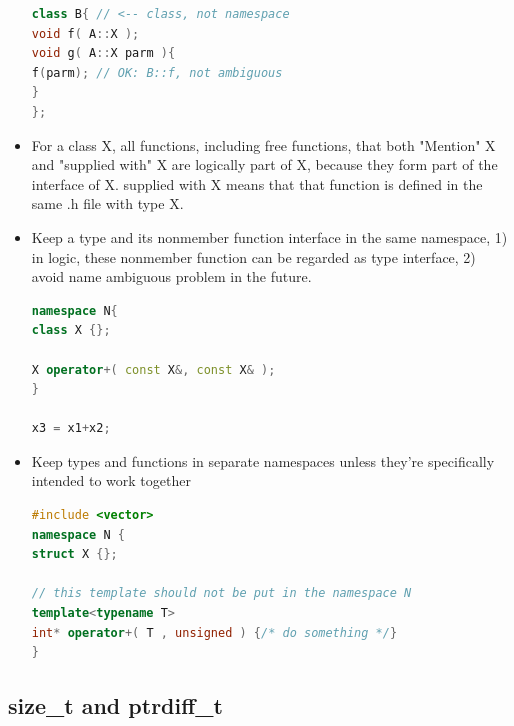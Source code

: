\documentclass[a4paper,12pt,twoside]{book}
\begin{document}
\begin{itemize}
\begin{lstlisting}[frame=single, language=c++]
class B{ // <-- class, not namespace
void f( A::X );
void g( A::X parm ){
f(parm); // OK: B::f, not ambiguous
}
};
\end{lstlisting}

\item For a class X, all functions, including free functions, that both "Mention" X
and "supplied with" X are logically part of X, because they form part of the interface of X. supplied with X means that that function is defined in the same .h file with type X. 

\item Keep a type and its nonmember function interface in the same namespace, 1) in logic, these nonmember function can be regarded as type interface, 2) avoid name ambiguous problem in the future.
\begin{lstlisting}[frame=single, language=c++]
namespace N{
class X {};

X operator+( const X&, const X& );
}

x3 = x1+x2;
\end{lstlisting}

\item Keep types and functions in separate namespaces unless they're specifically intended to work together

\begin{lstlisting}[frame=single, language=c++]
#include <vector>
namespace N {
struct X {};

// this template should not be put in the namespace N
template<typename T>
int* operator+( T , unsigned ) {/* do something */}
}
\end{lstlisting}

\end{itemize}

\subsection{size\_t and ptrdiff\_t}
\end{document}
